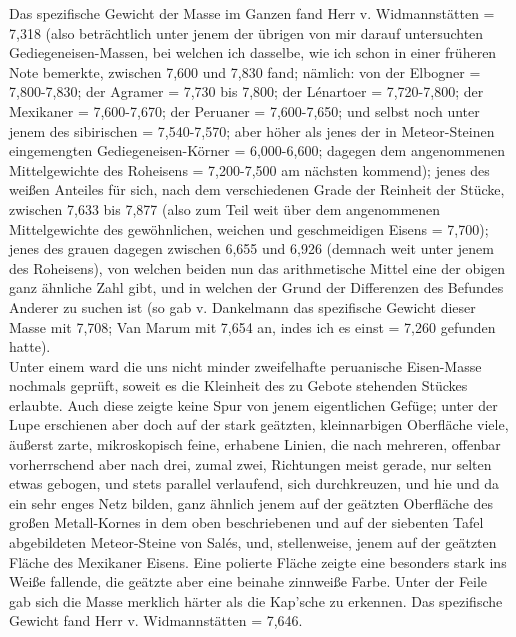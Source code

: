 \documentclass[a4paper, 11pt, oneside, german]{article}
\begin{document}
{Das spezifische Gewicht der Masse im Ganzen fand Herr v. Widmannstätten = 7,318 (also beträchtlich unter jenem der übrigen von mir darauf untersuchten Gediegeneisen-Massen, bei welchen ich dasselbe, wie ich schon in einer früheren Note bemerkte, zwischen 7,600 und 7,830 fand; nämlich: von der Elbogner = 7,800-7,830; der Agramer = 7,730 bis 7,800; der Lénartoer = 7,720-7,800; der Mexikaner = 7,600-7,670; der Peruaner = 7,600-7,650; und selbst noch unter jenem des sibirischen = 7,540-7,570; aber höher als jenes der in Meteor-Steinen eingemengten Gediegeneisen-Körner = 6,000-6,600; dagegen dem angenommenen Mittelgewichte des Roheisens = 7,200-7,500 am nächsten kommend); jenes des weißen Anteiles für sich, nach dem verschiedenen Grade der Reinheit der Stücke, zwischen 7,633 bis 7,877 (also zum Teil weit über dem angenommenen Mittelgewichte des gewöhnlichen, weichen und geschmeidigen Eisens = 7,700); jenes des grauen dagegen zwischen 6,655 und 6,926 (demnach weit unter jenem des Roheisens), von welchen beiden nun das arithmetische Mittel eine der obigen ganz ähnliche Zahl gibt, und in welchen der Grund der Differenzen des Befundes Anderer zu suchen ist (so gab v. Dankelmann das spezifische Gewicht dieser Masse mit 7,708; Van Marum mit 7,654 an, indes ich es einst = 7,260 gefunden hatte).\\
Unter einem ward die uns nicht minder zweifelhafte peruanische Eisen-Masse nochmals geprüft, soweit es die Kleinheit des zu Gebote stehenden Stückes erlaubte. Auch diese zeigte keine Spur von jenem eigentlichen Gefüge; unter der Lupe erschienen aber doch auf der stark geätzten, kleinnarbigen Oberfläche viele, äußerst zarte, mikroskopisch feine, erhabene Linien, die nach mehreren, offenbar vorherrschend aber nach drei, zumal zwei, Richtungen meist gerade, nur selten etwas gebogen, und stets parallel verlaufend, sich durchkreuzen, und hie und da ein sehr enges Netz bilden, ganz ähnlich jenem auf der geätzten Oberfläche des großen Metall-Kornes in dem oben beschriebenen und auf der siebenten Tafel abgebildeten Meteor-Steine von Salés, und, stellenweise, jenem auf der geätzten Fläche des Mexikaner Eisens. Eine polierte Fläche zeigte eine besonders stark ins Weiße fallende, die geätzte aber eine beinahe zinnweiße Farbe. Unter der Feile gab sich die Masse merklich härter als die Kap'sche zu erkennen. Das spezifische Gewicht fand Herr v. Widmannstätten = 7,646.\\
}
\end{document}

